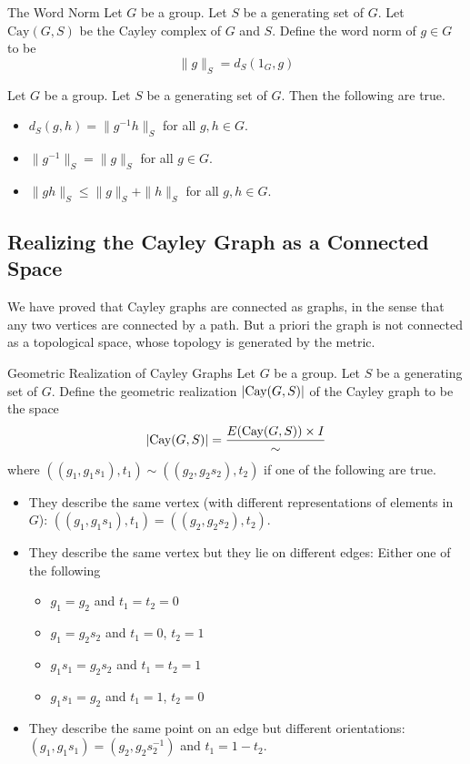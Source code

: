 \documentclass[a4paper]{article}
\begin{document}
\begin{defn}{The Word Norm}{} Let $G$ be a group. Let $S$ be a generating set of $G$. Let $\text{Cay}(G,S)$ be the Cayley complex of $G$ and $S$. Define the word norm of $g\in G$ to be $$\|g\|_S=d_S(1_G,g)$$
\end{defn}

\begin{lmm}{}{} Let $G$ be a group. Let $S$ be a generating set of $G$. Then the following are true. 
\begin{itemize}
\item $d_S(g,h)=\|g^{-1}h\|_S$ for all $g,h\in G$. 
\item $\|g^{-1}\|_S=\|g\|_S$ for all $g\in G$. 
\item $\|gh\|_S\leq\|g\|_S+\|h\|_S$ for all $g,h\in G$. 
\end{itemize}
\end{lmm}

\subsection{Realizing the Cayley Graph as a Connected Space}
We have proved that Cayley graphs are connected as graphs, in the sense that any two vertices are connected by a path. But a priori the graph is not connected as a topological space, whose topology is generated by the metric. 

\begin{defn}{Geometric Realization of Cayley Graphs}{} Let $G$ be a group. Let $S$ be a generating set of $G$. Define the geometric realization $\abs{\text{Cay}(G,S)}$ of the Cayley graph to be the space $$\abs{\text{Cay}(G,S)}=\frac{E(\text{Cay}(G,S))\times I}{\sim}$$ where $((g_1,g_1s_1),t_1)\sim((g_2,g_2s_2),t_2)$ if one of the following are true. 
\begin{itemize}
\item They describe the same vertex (with different representations of elements in $G$): $((g_1,g_1s_1),t_1)=((g_2,g_2s_2),t_2)$. 
\item They describe the same vertex but they lie on different edges: Either one of the following
\begin{itemize}
\item $g_1=g_2$ and $t_1=t_2=0$
\item $g_1=g_2s_2$ and $t_1=0$, $t_2=1$
\item $g_1s_1=g_2s_2$ and $t_1=t_2=1$
\item $g_1s_1=g_2$ and $t_1=1$, $t_2=0$
\end{itemize}
\item They describe the same point on an edge but different orientations: $(g_1,g_1s_1)=(g_2,g_2s_2^{-1})$ and $t_1=1-t_2$. 
\end{itemize}
\end{defn}
\end{document}
